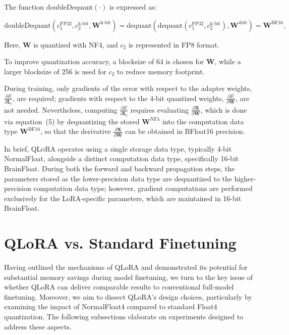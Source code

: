 The function doubleDequant$(\cdot)$ is expressed as:

\begin{equation}
    \text{doubleDequant}(c_1^{\text{FP32}}, c_2^{\text{k-bit}}, \mathbf{W}^{\text{k-bit}}) = \text{dequant}(\text{dequant}(c_1^{\text{FP32}}, c_2^{\text{k-bit}}), \mathbf{W}^{\text{4bit}}) = \mathbf{W}^{\text{BF16}},
\end{equation}

Here, $\mathbf{W}$ is quantized with NF4, and $c_2$ is represented in FP8 format.

To improve quantization accuracy, a blocksize of 64 is chosen for $\mathbf{W}$, while a larger blocksize of 256 is used for $c_2$ to reduce memory footprint.

During training, only gradients of the error with respect to the adapter weights, $\frac{\partial E}{\partial \mathbf{L}_i}$, are required; gradients with respect to the 4-bit quantized weights, $\frac{\partial E}{\partial \mathbf{W}}$, are not needed. Nevertheless, computing $\frac{\partial E}{\partial \mathbf{L}_i}$ requires evaluating $\frac{\partial \mathbf{X}}{\partial \mathbf{W}}$, which is done via equation~(5) by dequantizing the stored $\mathbf{W}^{\text{NF4}}$ into the computation data type $\mathbf{W}^{\text{BF16}}$, so that the derivative $\frac{\partial \mathbf{X}}{\partial \mathbf{W}}$ can be obtained in BFloat16 precision.

In brief, \textsc{QLoRA} operates using a single storage data type, typically 4-bit NormalFloat, alongside a distinct computation data type, specifically 16-bit BrainFloat. During both the forward and backward propagation steps, the parameters stored as the lower-precision data type are dequantized to the higher-precision computation data type; however, gradient computations are performed exclusively for the LoRA-specific parameters, which are maintained in 16-bit BrainFloat.

\section{QLoRA vs. Standard Finetuning}
\label{sec:comp_to_std}

Having outlined the mechanisms of QLoRA and demonstrated its potential for substantial memory savings during model finetuning, we turn to the key issue of whether QLoRA can deliver comparable results to conventional full-model finetuning. Moreover, we aim to dissect QLoRA's design choices, particularly by examining the impact of NormalFloat4 compared to standard Float4 quantization. The following subsections elaborate on experiments designed to address these aspects.

